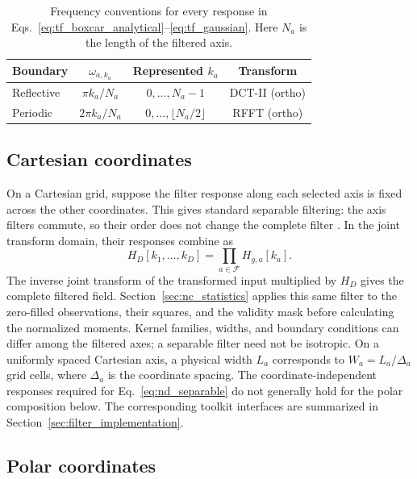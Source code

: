 \documentclass[a4paper,fleqn]{cas-sc}
\begin{document}
\begin{table}[htbp]
	\centering
	\caption{Frequency conventions for every response in Eqs.~\ref{eq:tf_boxcar_analytical}--\ref{eq:tf_gaussian}. Here $N_a$ is the length of the filtered axis.}
	\label{tab:frequency_vars}
	\begin{tabular}{lccc}
		\toprule
		Boundary & $\omega_{a,k_a}$ & Represented $k_a$ & Transform \\
		\midrule
		Reflective & $\pi k_a/N_a$ & $0,\ldots,N_a-1$ & DCT-II (ortho) \\
		Periodic & $2\pi k_a/N_a$ & $0,\ldots,\lfloor N_a/2\rfloor$ & RFFT (ortho) \\
		\bottomrule
	\end{tabular}
\end{table}

\subsection{Cartesian coordinates}

On a Cartesian grid, suppose the filter response along each selected axis is fixed across the other coordinates. This gives standard separable filtering: the axis filters commute, so their order does not change the complete filter \citep[Chap.~24]{Smith1997}. In the joint transform domain, their responses combine as
\begin{equation}
	H_D[k_1,\ldots,k_D] = \prod_{a\in\mathcal{F}} H_{g,a}[k_a].
	\label{eq:nd_separable}
\end{equation}
The inverse joint transform of the transformed input multiplied by $H_D$ gives the complete filtered field. Section~\ref{sec:nc_statistics} applies this same filter to the zero-filled observations, their squares, and the validity mask before calculating the normalized moments. Kernel families, widths, and boundary conditions can differ among the filtered axes; a separable filter need not be isotropic. On a uniformly spaced Cartesian axis, a physical width $L_a$ corresponds to $W_a=L_a/\Delta_a$ grid cells, where $\Delta_a$ is the coordinate spacing. The coordinate-independent responses required for Eq.~\ref{eq:nd_separable} do not generally hold for the polar composition below. The corresponding toolkit interfaces are summarized in Section~\ref{sec:filter_implementation}.

\subsection{Polar coordinates}
\label{sec:polar}
\end{document}
